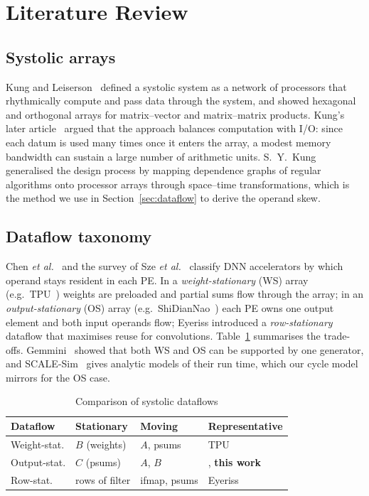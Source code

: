 \documentclass[conference]{IEEEtran}
\begin{document}
\section{Literature Review}

\subsection{Systolic arrays}
Kung and Leiserson~\cite{kung1979systolic} defined a systolic system as a
network of processors that rhythmically compute and pass data through the
system, and showed hexagonal and orthogonal arrays for matrix--vector and
matrix--matrix products. Kung's later article~\cite{kung1982why} argued that
the approach balances computation with I/O: since each datum is used many times
once it enters the array, a modest memory bandwidth can sustain a large number
of arithmetic units. S.~Y.~Kung~\cite{kung1988vlsi} generalised the design
process by mapping dependence graphs of regular algorithms onto processor
arrays through space--time transformations, which is the method we use in
Section~\ref{sec:dataflow} to derive the operand skew.

\subsection{Dataflow taxonomy}
Chen \emph{et al.}~\cite{chen2017eyeriss} and the survey of Sze
\emph{et al.}~\cite{sze2017efficient} classify DNN accelerators by which
operand stays resident in each PE. In a \emph{weight-stationary} (WS) array
(e.g.\ TPU~\cite{jouppi2017tpu}) weights are preloaded and partial sums flow
through the array; in an \emph{output-stationary} (OS) array
(e.g.\ ShiDianNao~\cite{du2015shidiannao}) each PE owns one output element and
both input operands flow; Eyeriss introduced a \emph{row-stationary} dataflow
that maximises reuse for convolutions. Table~\ref{tab:dataflow} summarises the
trade-offs. Gemmini~\cite{genc2021gemmini} showed that both WS and OS can be
supported by one generator, and SCALE-Sim~\cite{samajdar2018scalesim} gives
analytic models of their run time, which our cycle model mirrors for the OS
case.

\begin{table}[t]
\centering
\caption{Comparison of systolic dataflows}
\label{tab:dataflow}
\setlength{\tabcolsep}{3pt}
\begin{tabular}{@{}llll@{}}
\toprule
Dataflow & Stationary & Moving & Representative \\
\midrule
Weight-stat.  & $B$ (weights)  & $A$, psums & TPU~\cite{jouppi2017tpu} \\
Output-stat.  & $C$ (psums)    & $A$, $B$         & \cite{du2015shidiannao}, \textbf{this work} \\
Row-stat.     & rows of filter & ifmap, psums     & Eyeriss~\cite{chen2017eyeriss} \\
\bottomrule
\end{tabular}
\end{table}
\end{document}
